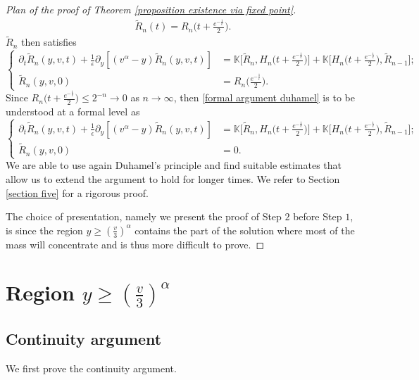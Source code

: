 \documentclass[11pt]{article}
\numberwithin{equation}{section}
\begin{document}
\begin{proof}[Plan of the proof of Theorem \ref{proposition existence via fixed point}]
\begin{align*}
\tilde{R}_{n}(t)=R_{n}\bigg(t+\frac{e^{-\frac{1}{\epsilon}}}{2}\bigg).
\end{align*}
$\tilde{R}_{n}$ then satisfies
\begin{equation}\label{formal argument duhamel}
\left\{\begin{aligned}
\partial_t \tilde{R}_n(y,v,t)+\frac{1}{\epsilon}\partial_y[(v^{\alpha}-y) \tilde{R}_n(y,v,t)]&=\mathbb{K}\bigg[\tilde{R}_n,H_{n}\bigg(t+\frac{e^{-\frac{1}{\epsilon}}}{2}\bigg)\bigg]+\mathbb{K}\bigg[H_{n}\bigg(t+\frac{e^{-\frac{1}{\epsilon}}}{2}\bigg),\tilde{R}_{n-1}\bigg]; \\
\tilde{R}_{n}(y,v,0)&=R_{n}\bigg(\frac{e^{-\frac{1}{\epsilon}}}{2}\bigg).
   \end{aligned}\right.
   \end{equation}
Since $R_{n}\bigg(t+\frac{e^{-\frac{1}{\epsilon}}}{2}\bigg)\leq 2^{-n}\rightarrow 0$ as $n\rightarrow \infty$, then \eqref{formal argument duhamel} is to be understood at a formal level as
 \begin{equation}
\left\{\begin{aligned}
\partial_t \tilde{R}_n(y,v,t)+\frac{1}{\epsilon}\partial_y[(v^{\alpha}-y) \tilde{R}_n(y,v,t)]&=\mathbb{K}\bigg[\tilde{R}_n,H_{n}\bigg(t+\frac{e^{-\frac{1}{\epsilon}}}{2}\bigg)\bigg]+\mathbb{K}\bigg[H_{n}\bigg(t+\frac{e^{-\frac{1}{\epsilon}}}{2}\bigg),\tilde{R}_{n-1}\bigg]; \\
\tilde{R}_{n}(y,v,0)&=0.
   \end{aligned}\right.
   \end{equation}
We are able to use again Duhamel's principle and find suitable estimates that allow us to extend the argument to hold for longer times. We refer to Section \ref{section five} for a rigorous proof. 



The choice of presentation, namely we present the proof of Step $2$ before Step $1$, is since the region $y\geq (\frac{v}{3})^{\alpha}$ contains the part of the solution where most of the mass will concentrate and is thus more difficult to prove.
\end{proof} 
\section{Region $y\geq (\frac{v}{3})^{\alpha}$}\label{section three}
\subsection{Continuity argument}
We first prove the continuity argument.
\end{document}
